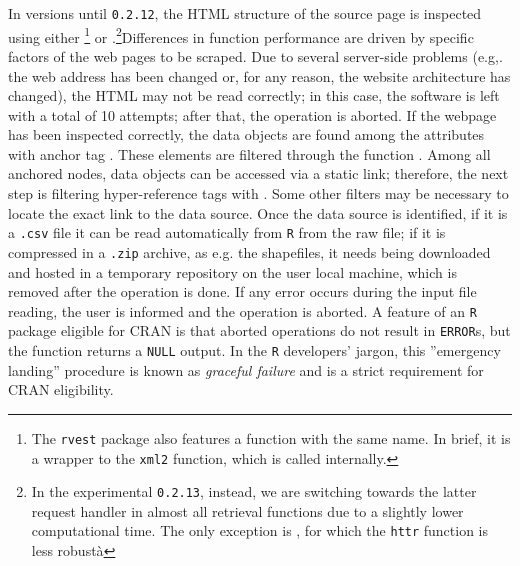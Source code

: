 \documentclass[openany, 11pt, oneside]{book}
\begin{document}
In versions until \texttt{0.2.12}, the HTML structure of the source page is inspected using either \texttt{}\footnote{The \texttt{rvest} package also features a function with the same name. In brief, it is a wrapper to the \texttt{xml2} function, which is called internally.} or \texttt{}.\footnote{In the experimental \texttt{0.2.13}, instead, we are switching towards the latter request handler in almost all retrieval functions due to a slightly lower computational time. The only exception is \texttt{}, for which the \texttt{httr} function is less robustà}Differences in function performance are driven by specific factors of the web pages to be scraped. Due to several server-side problems (e.g,. the web address has been changed or, for any reason, the website architecture has changed), the HTML may not be read correctly; in this case, the software is left with a total of 10 attempts; after that, the operation is aborted. If the webpage has been inspected correctly, the data objects are found among the attributes with anchor tag \texttt{} \parencite{munzert2015automated}. These elements are filtered through the function \texttt{} \parencite{rvest}. Among all anchored nodes, data objects can be accessed via a static link; therefore, the next step is filtering hyper-reference tags with \texttt{}. Some other filters may be necessary to locate the exact link to the data source. Once the data source is identified, if it is a \texttt{.csv} file it can be read automatically from \texttt{R} from the raw file; if it is compressed in a \texttt{.zip} archive, as e.g. the shapefiles, it needs being downloaded and hosted in a temporary repository on the user local machine, which is removed after the operation is done. If any error occurs during the input file reading, the user is informed and the operation is aborted. A feature of an \texttt{R} package eligible for CRAN is that aborted operations do not result in \texttt{ERROR}s, but the function returns a \texttt{NULL} output. In the \texttt{R} developers' jargon, this ''emergency landing'' procedure is known as \textit{graceful failure} and is a strict requirement for CRAN eligibility.
\end{document}
